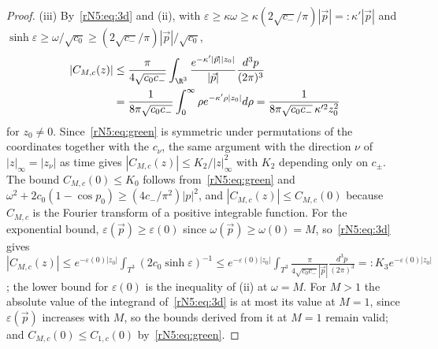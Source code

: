 \begin{proof}
(iii) By~\eqref{rN5:eq:3d} and (ii), with $\varepsilon\ge\kappa\omega\ge\kappa
(2\sqrt{c_-}/\pi)|\vec p|=:\kappa'|\vec p|$ and $\sinh\varepsilon\ge\omega/
\sqrt{c_0}\ge(2\sqrt{c_-}/\pi)|\vec p|/\sqrt{c_0}$,
\[
\begin{split}
|C_{M,c}(z)|&\le\frac{\pi}{4\sqrt{c_0c_-}}\int_{\R^3}\frac{e^{-\kappa'|\vec
p||z_0|}}{|\vec p|}\frac{d^3p}{(2\pi)^3}\\
&=\frac{1}{8\pi\sqrt{c_0c_-}}\int_0^\infty\rho e^{-\kappa'\rho|z_0|}d\rho
=\frac{1}{8\pi\sqrt{c_0c_-}\,\kappa'^2z_0^2}
\end{split}
\]
for $z_0\ne0$. Since~\eqref{rN5:eq:green} is symmetric under permutations of
the coordinates together with the $c_\nu$, the same argument with the
direction $\nu$ of $|z|_\infty=|z_\nu|$ as time gives $|C_{M,c}(z)|\le
K_2/|z|_\infty^2$ with $K_2$ depending only on $c_\pm$. The bound $C_{M,c}(0)\le
K_0$ follows from~\eqref{rN5:eq:green} and $\omega^2+2c_0(1-\cos p_0)\ge(4c_-/
\pi^2)|p|^2$, and $|C_{M,c}(z)|\le C_{M,c}(0)$ because $C_{M,c}$ is the Fourier
transform of a positive integrable function. For the exponential bound,
$\varepsilon(\vec p)\ge\varepsilon(0)$ since $\omega(\vec p)\ge\omega(0)=M$,
so~\eqref{rN5:eq:3d} gives $|C_{M,c}(z)|\le e^{-\varepsilon(0)|z_0|}\int_{T^3}
(2c_0\sinh\varepsilon)^{-1}\le e^{-\varepsilon(0)|z_0|}\int_{T^3}\frac{\pi}
{4\sqrt{c_0c_-}|\vec p|}\frac{d^3p}{(2\pi)^3}=:K_3e^{-\varepsilon(0)|z_0|}$;
the lower bound for $\varepsilon(0)$ is the inequality of (ii) at $\omega=M$.
For $M>1$ the absolute value of the integrand of~\eqref{rN5:eq:3d} is at
most its value at $M=1$, since $\varepsilon(\vec p)$ increases with $M$,
so the bounds derived from it at $M=1$ remain valid; and $C_{M,c}(0)\le
C_{1,c}(0)$ by~\eqref{rN5:eq:green}.


\end{proof}
